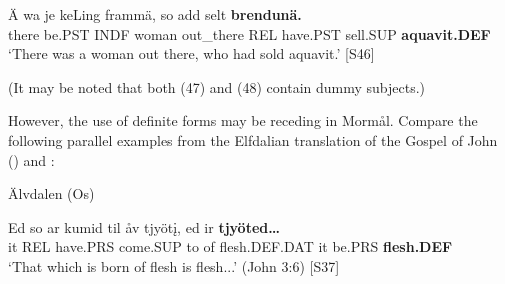  \ea\label{}
\gll Ä  wa  je  keLing  frammä,  so  add  selt  \textbf{brendunä.}\\


there  be.PST  INDF  woman  out\_there  REL  have.PST  sell.SUP  \textbf{aquavit.DEF}\\

\glt ‘There was a woman out there, who had sold aquavit.’ [S46]

\z

(It may be noted that both (47) and (48) contain dummy subjects.)


However, the use of definite forms may be receding in Mormål. Compare the following parallel examples from the Elfdalian translation of the Gospel of John () and :


\item 


\item 

Älvdalen (Os)



 \ea\label{}
\gll Ed  so  ar  kumid  til  åv  tjyöt\k{i},  ed  ir  \textbf{tjyöted…}\\


it  REL  have.PRS  come.SUP  to  of  flesh.DEF.DAT  it  be.PRS  \textbf{flesh.DEF}\\

\glt ‘That which is born of flesh is flesh...’ (John 3:6) [S37]

\z

\item 


